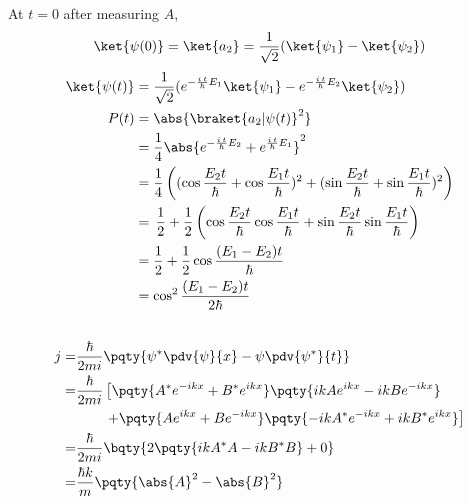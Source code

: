 \documentclass[12pt]{article}
\begin{document}
\subsubsection{} At $t=0$ after measuring $A$, \[
    \ket{\psi(0)} = \ket{a_2} = \frac{1}{\sqrt{2}}( \ket{\psi_1} - \ket{\psi_2} )  \]
    \begin{align*}
        \ket{\psi(t)} &=  \frac{1}{\sqrt{2}}( e^{ -\frac{i\,t}{\hbar}E_1}\ket{\psi_1}
        - e^{ -\frac{i\,t}{\hbar}E_2}\ket{\psi_2}) \\
        P(t) &= \abs{\braket{a_2|\psi(t)}^2 }\\
        &= \frac{1}{4} \abs{ e^{ -\frac{i\,t}{\hbar}E_2} + e^{\frac{i\,t}{\hbar}E_1}}^2\\
        &= \frac{1}{4} \left((\cos \frac{E_2t}{ \hbar} + \cos \frac{E_1 t}{ \hbar})^2 +
        (\sin \frac{E_2t}{ \hbar} + \sin \frac{E_1 t}{ \hbar})^2\right)\\
        &=\, \frac{1}{2} + \frac{1}{2}\left(\cos \frac{E_2t}{ \hbar}\cos \frac{E_1t}{ \hbar} +
        \sin \frac{E_2t}{ \hbar}\sin \frac{E_1t}{ \hbar}\right)\\
        &= \frac{1}{2} + \frac{1}{2}\cos \frac{(E_1 - E_2)t}{ \hbar}\\
        &= \cos^2\frac{(E_1 - E_2)t}{2 \hbar}\, 
    \end{align*}
\subsection{} \begin{align*}
j=&\frac{\hbar}{2mi} \pqty{\psi^* \pdv{\psi }{x} - \psi \pdv{\psi^*}{t}}\\
=&\frac{\hbar}{2mi} \left[\pqty{A^*e^{ - ikx} + B^*e^{ikx}}\pqty{ikAe^{ikx} - ik Be^{ -ikx}} \right.\\
&\qquad\left.+\pqty{Ae^{ikx} + Be^{ -ikx}}\pqty{ -ikA^*e^{ -ikx} + ik B^*e^{ikx}}\right]\\
=& \frac{\hbar}{2mi} \bqty{2\pqty{ik A^*A - ikB^*B} + 0}\\
=& \frac{\hbar k}{m} \pqty{\abs{A}^2 - \abs{B}^2}
\end{align*}
\subsection{}
\end{document}

